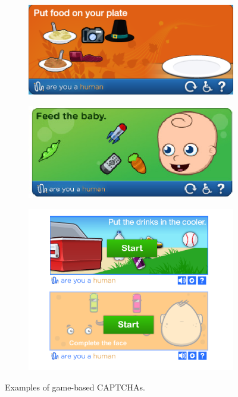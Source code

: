 \begin{figure}[h]
     \centering
     \begin{subfigure}[b]{0.48\textwidth}
         \centering
         \includegraphics[width=.9\linewidth]{Images/StateOfArt/game_CAPTCHA}
     \end{subfigure}
     \hfill
     \begin{subfigure}[b]{0.48\textwidth}
         \centering
         \includegraphics[width=.9\linewidth]{Images/StateOfArt/game_CAPTCHA2}
     \end{subfigure}
		
	 \begin{subfigure}[b]{0.55\textwidth}
         \centering
         \includegraphics[width=\linewidth]{Images/StateOfArt/game_CAPTCHA3}
     \end{subfigure}
     \caption{\footnotesize{Examples of game-based CAPTCHAs.}}
     \label{soa:game}
\end{figure}


